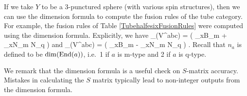 If we take $Y$ to be a 3-punctured sphere (with various spin structures),
then we can use the dimension formula to compute the fusion rules of the tube category.
For example, the fusion rules of Table \ref{TubehalfesixFusionRules} were computed using
the dimension formula.
Explicitly, we have
\be
	\dim_{}(V^{abc}) = \left(
			\sum_{x\in B_m}  +
			\sum_{x\in N_m \cup N_q} 
	\right)
\ee
and
\be
	\dim_{}(V^{abc}) = \left(
			\sum_{x\in B_m}  -
			\sum_{x\in N_m \cup N_q} 
	\right) .
\ee
Recall that $n_a$ is defined to be $\dim(\text{End}(a))$, i.e.\ 1 if $a$ is m-type and 2 if $a$ is q-type.

We remark that the dimension formula is a useful check on $S$-matrix accuracy.
Mistakes in calculating the $S$ matrix typically lead to non-integer outputs from the dimension formula.
